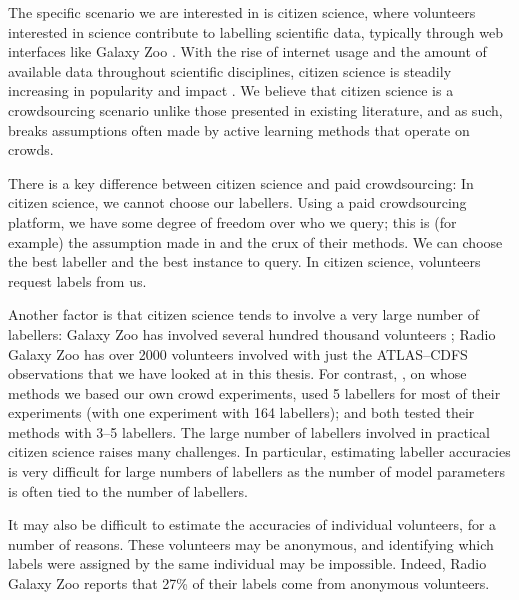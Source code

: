    The specific scenario we are interested in is citizen science, where
    volunteers interested in science contribute to labelling scientific data,
    typically through web interfaces like Galaxy Zoo \citep{lintott11}. With the
    rise of internet usage and the amount of available data throughout
    scientific disciplines, citizen science is steadily increasing in popularity
    and impact \citep{marshall15}. We believe that citizen science is a
    crowdsourcing scenario unlike those presented in existing literature, and as
    such, breaks assumptions often made by active learning methods that operate
    on crowds.

    There is a key difference between citizen science and paid crowdsourcing: In
    citizen science, we cannot choose our labellers. Using a paid crowdsourcing
    platform, we have some degree of freedom over who we query; this is (for
    example) the assumption made in \citet{yan11} and the crux of their methods.
    We can choose the best labeller and the best instance to query. In citizen
    science, volunteers request labels from us.

    Another factor is that citizen science tends to involve a very large number
    of labellers: Galaxy Zoo has involved several hundred thousand volunteers
    \citep{marshall15}; Radio Galaxy Zoo has over 2000 volunteers involved with
    just the ATLAS--CDFS observations that we have looked at in this thesis. For
    contrast, \citet{raykar10}, on whose methods we based our own crowd
    experiments, used 5 labellers for most of their experiments (with one
    experiment with 164 labellers); \citet{mozafari12} and \citet{yan11} both
    tested their methods with 3--5 labellers. The large number of labellers
    involved in practical citizen science raises many challenges. In particular,
    estimating labeller accuracies is very difficult for large numbers of
    labellers as the number of model parameters is often tied to the number of
    labellers.

    It may also be difficult to estimate the accuracies of individual
    volunteers, for a number of reasons. These volunteers may be anonymous, and
    identifying which labels were assigned by the same individual may be
    impossible. Indeed, Radio Galaxy Zoo reports that 27\% of their labels come
    from anonymous volunteers.

